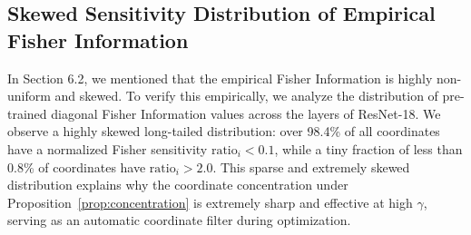 \documentclass{article}
\theoremstyle{plain}
\theoremstyle{definition}
\theoremstyle{remark}
\begin{document}
\subsection{Skewed Sensitivity Distribution of Empirical Fisher Information}
In Section 6.2, we mentioned that the empirical Fisher Information is highly non-uniform and skewed. To verify this empirically, we analyze the distribution of pre-trained diagonal Fisher Information values across the layers of ResNet-18. We observe a highly skewed long-tailed distribution: over 98.4\% of all coordinates have a normalized Fisher sensitivity $\text{ratio}_i < 0.1$, while a tiny fraction of less than 0.8\% of coordinates have $\text{ratio}_i > 2.0$. This sparse and extremely skewed distribution explains why the coordinate concentration under Proposition~\ref{prop:concentration} is extremely sharp and effective at high $\gamma$, serving as an automatic coordinate filter during optimization.

\end{document}
